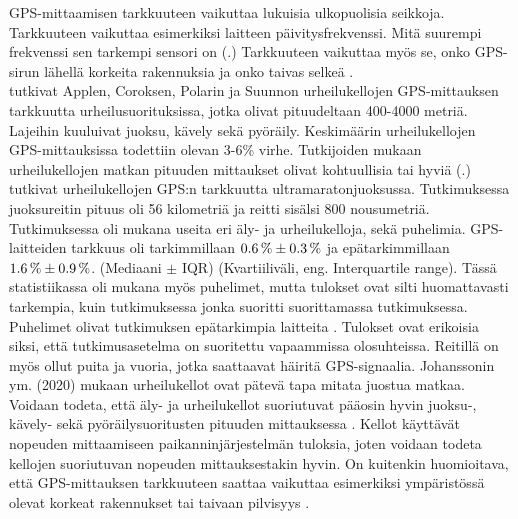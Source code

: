 \documentclass[utf8,bachelor,finnish]{bachelor}
\begin{document}
  GPS-mittaamisen tarkkuuteen vaikuttaa lukuisia ulkopuolisia seikkoja. Tarkkuuteen vaikuttaa esimerkiksi laitteen päivitysfrekvenssi.
   Mitä suurempi frekvenssi sen tarkempi sensori on (\cite{cummins_global_2013}.) Tarkkuuteen vaikuttaa myös
    se, onko GPS-sirun lähellä korkeita rakennuksia ja onko taivas selkeä \parencite{baranski_enhancing_2012}. \\

  \textcite{gilgen-ammann_accuracy_2020} tutkivat Applen, Coroksen, Polarin ja Suunnon urheilukellojen GPS-mittauksen tarkkuutta urheilusuorituksissa, jotka olivat
    pituudeltaan 400-4000 metriä. Lajeihin kuuluivat juoksu, kävely sekä pyöräily. Keskimäärin urheilukellojen GPS-mittauksissa todettiin olevan 3-6\% virhe.
    Tutkijoiden mukaan urheilukellojen matkan pituuden mittaukset olivat kohtuullisia tai hyviä (\cite{gilgen-ammann_accuracy_2020}.)\\

  \textcite{johansson_accuracy_2020} tutkivat urheilukellojen GPS:n tarkkuutta ultramaratonjuoksussa. Tutkimuksessa juoksureitin pituus oli 56 kilometriä ja reitti sisälsi 800 nousumetriä.
   Tutkimuksessa oli mukana useita eri äly- ja urheilukelloja, sekä puhelimia.
    GPS-laitteiden tarkkuus oli tarkimmillaan $\SI{0,6 \pm 0,3}{\percent}$ ja epätarkimmillaan $ \SI{1,6 \pm 0,9}{\percent} $. (Mediaani $\pm$ IQR) (Kvartiiliväli, eng. Interquartile range).
     Tässä statistiikassa oli mukana myös puhelimet, mutta 
      tulokset ovat silti huomattavasti tarkempia, kuin tutkimuksessa jonka suoritti \textcite{gilgen-ammann_accuracy_2020} suorittamassa tutkimuksessa. Puhelimet olivat tutkimuksen epätarkimpia laitteita \parencite{johansson_accuracy_2020}.
       Tulokset ovat erikoisia siksi, että \textcite{johansson_accuracy_2020} tutkimusasetelma on suoritettu vapaammissa olosuhteissa. Reitillä on myös ollut puita ja vuoria, jotka saattaavat häiritä GPS-signaalia.
        Johanssonin ym. (2020) mukaan urheilukellot ovat pätevä tapa mitata juostua matkaa.\\

  Voidaan todeta, että äly- ja urheilukellot suoriutuvat pääosin hyvin juoksu-, kävely- sekä pyöräilysuoritusten pituuden mittauksessa \parencite{gilgen-ammann_accuracy_2020,johansson_accuracy_2020}.
   Kellot käyttävät nopeuden mittaamiseen paikanninjärjestelmän tuloksia, joten voidaan todeta kellojen suoriutuvan nopeuden mittauksestakin hyvin. On kuitenkin huomioitava,
    että GPS-mittauksen tarkkuuteen saattaa vaikuttaa esimerkiksi ympäristössä olevat korkeat rakennukset tai taivaan pilvisyys \parencite{baranski_enhancing_2012}.
\end{document}
